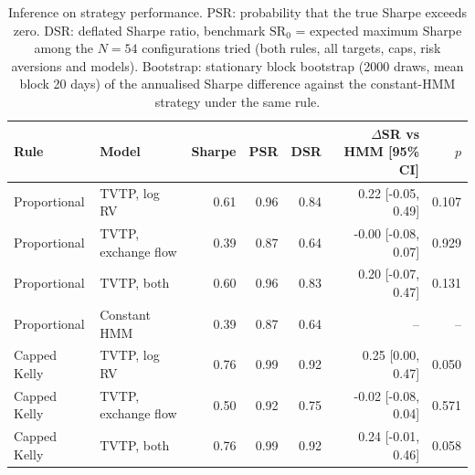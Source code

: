 \begin{table}[t]\centering\small
\caption{Inference on strategy performance. PSR: probability that the true Sharpe exceeds zero. DSR: deflated Sharpe ratio, benchmark $\mathrm{SR}_0$ = expected maximum Sharpe among the $N=54$ configurations tried (both rules, all targets, caps, risk aversions and models). Bootstrap: stationary block bootstrap (2000 draws, mean block 20 days) of the annualised Sharpe difference against the constant-HMM strategy under the same rule.}\label{tab:sig}
\begin{tabular}{llrrrrr}\toprule Rule & Model & Sharpe & PSR & DSR & $\Delta$SR vs HMM [95\% CI] & $p$ \\ \midrule
Proportional & TVTP, log RV & 0.61 & 0.96 & 0.84 & 0.22 [-0.05, 0.49] & 0.107 \\
Proportional & TVTP, exchange flow & 0.39 & 0.87 & 0.64 & -0.00 [-0.08, 0.07] & 0.929 \\
Proportional & TVTP, both & 0.60 & 0.96 & 0.83 & 0.20 [-0.07, 0.47] & 0.131 \\
Proportional & Constant HMM & 0.39 & 0.87 & 0.64 & -- & -- \\
Capped Kelly & TVTP, log RV & 0.76 & 0.99 & 0.92 & 0.25 [0.00, 0.47] & 0.050 \\
Capped Kelly & TVTP, exchange flow & 0.50 & 0.92 & 0.75 & -0.02 [-0.08, 0.04] & 0.571 \\
Capped Kelly & TVTP, both & 0.76 & 0.99 & 0.92 & 0.24 [-0.01, 0.46] & 0.058 \\
\bottomrule\end{tabular}\end{table}
